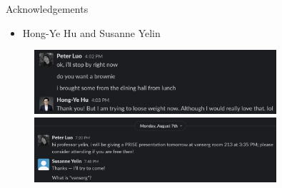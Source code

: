 \documentclass[xcolor=dvipsnames]{beamer}
\begin{document}
\begin{frame}{Acknowledgements}
  \begin{itemize}
    \item Hong-Ye Hu and Susanne Yelin  
  \end{itemize}
  \begin{figure}[ht]
    \centering
    \includegraphics[width=0.8\textwidth]{HongYe.png}

    \centering
    \includegraphics[width=0.8\textwidth]{Yelin.png}
  \end{figure}
\end{frame}
\end{document}
